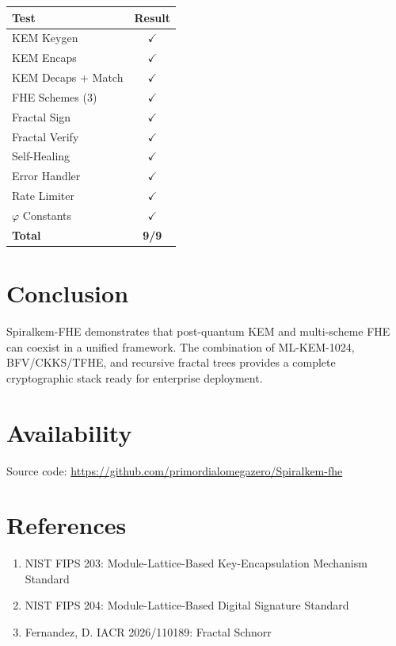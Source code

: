 \documentclass{article}
\begin{document}
\begin{center}
\begin{tabular}{|l|c|}
\hline
\textbf{Test} & \textbf{Result} \\
\hline
KEM Keygen & $\checkmark$ \\
KEM Encaps & $\checkmark$ \\
KEM Decaps + Match & $\checkmark$ \\
FHE Schemes (3) & $\checkmark$ \\
Fractal Sign & $\checkmark$ \\
Fractal Verify & $\checkmark$ \\
Self-Healing & $\checkmark$ \\
Error Handler & $\checkmark$ \\
Rate Limiter & $\checkmark$ \\
$\varphi$ Constants & $\checkmark$ \\
\hline
\textbf{Total} & \textbf{9/9} \\
\hline
\end{tabular}
\end{center}

\section{Conclusion}

Spiralkem-FHE demonstrates that post-quantum KEM and multi-scheme FHE can coexist in a unified framework. The combination of ML-KEM-1024, BFV/CKKS/TFHE, and recursive fractal trees provides a complete cryptographic stack ready for enterprise deployment.

\section*{Availability}

Source code: \url{https://github.com/primordialomegazero/Spiralkem-fhe}

\section*{References}
\begin{enumerate}
\item NIST FIPS 203: Module-Lattice-Based Key-Encapsulation Mechanism Standard
\item NIST FIPS 204: Module-Lattice-Based Digital Signature Standard
\item Fernandez, D. IACR 2026/110189: Fractal Schnorr
\end{enumerate}
\end{document}
